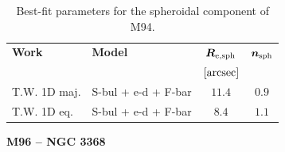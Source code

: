 \documentclass[preprint2]{emulateapj}
\begin{document}
  \begin{table}[h]
  \small
  \caption{Best-fit parameters for the spheroidal component of M94.}
  \begin{center}
  \begin{tabular}{llcc}
  \hline
  {\bf Work} & {\bf Model}   & $\bm R_{\rm e,sph}$    & $\bm n_{\rm sph}$ \\
    &  &  $[\rm arcsec]$ & \\
  \hline
  T.W. 1D maj. & S-bul + e-d + F-bar & $11.4$  &  $0.9$ \\
  T.W. 1D eq.  & S-bul + e-d + F-bar & $8.4$   &  $1.1$ \\
  \hline
  \end{tabular}
  \end{center}
  \label{tab:m94}
  \end{table}


  \clearpage\newpage\noindent
  {\bf M96 -- NGC 3368 \\}
\end{document}
